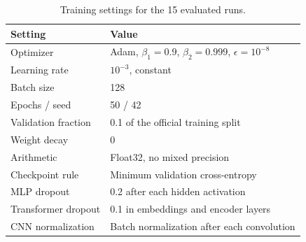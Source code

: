 \begin{table}[htbp]
\centering\small
\caption{Training settings for the 15 evaluated runs.}
\label{tab:training-setup}
\begin{tabular}{ll}
\toprule
Setting & Value\\
\midrule
Optimizer & Adam, $\beta_1=0.9$, $\beta_2=0.999$, $\epsilon=10^{-8}$\\
Learning rate & $10^{-3}$, constant\\
Batch size & 128\\
Epochs / seed & 50 / 42\\
Validation fraction & 0.1 of the official training split\\
Weight decay & 0\\
Arithmetic & Float32, no mixed precision\\
Checkpoint rule & Minimum validation cross-entropy\\
MLP dropout & 0.2 after each hidden activation\\
Transformer dropout & 0.1 in embeddings and encoder layers\\
CNN normalization & Batch normalization after each convolution\\
\bottomrule
\end{tabular}
\end{table}
